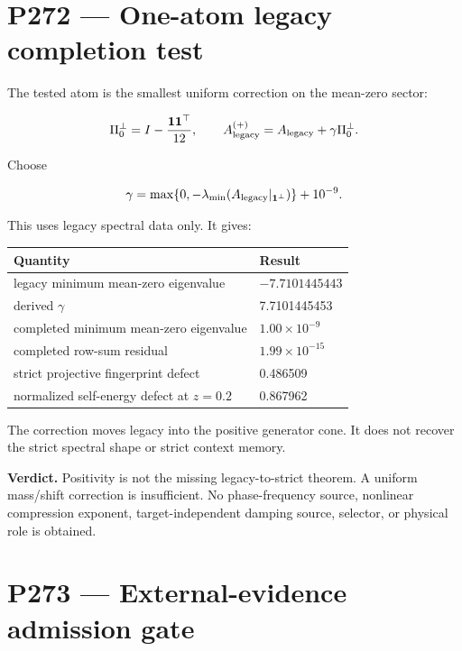 \documentclass[11pt,a4paper,openany]{report}
\begin{document}
\chapter{P272 --- One-atom legacy completion test}

The tested atom is the smallest uniform correction on the mean-zero sector:

\[
\Pi_0^\perp
=
I-\frac{\mathbf1\mathbf1^\top}{12},
\qquad
A_{\rm legacy}^{(+)}
=
A_{\rm legacy}+\gamma\Pi_0^\perp.
\]

Choose

\[
\gamma
=
\max\{0,-\lambda_{\min}
(A_{\rm legacy}|_{\mathbf1^\perp})\}
+10^{-9}.
\]

This uses legacy spectral data only. It gives:

\begin{center}
\begingroup\small
\setlength{\tabcolsep}{2.5pt}
\renewcommand{\arraystretch}{1.16}
\begin{longtable}{@{}p{}p{}@{}}
\toprule
\textbf{Quantity} & \textbf{Result} \\
\midrule
\endhead
legacy minimum mean-zero eigenvalue & \(-7.7101445443\) \\
derived \(\gamma\) & 7.7101445453 \\
completed minimum mean-zero eigenvalue & \(1.00\times10^{-9}\) \\
completed row-sum residual & \(1.99\times10^{-15}\) \\
strict projective fingerprint defect & 0.486509 \\
normalized self-energy defect at \(z=0.2\) & 0.867962 \\
\bottomrule
\end{longtable}
\endgroup
\end{center}

The correction moves legacy into the positive generator cone. It does not recover the strict spectral shape or strict context memory.

\textbf{Verdict.} Positivity is not the missing legacy-to-strict theorem. A uniform mass/\allowbreak{}shift correction is insufficient. No phase-frequency source, nonlinear compression exponent, target-independent damping source, selector, or physical role is obtained.

\chapter{P273 --- External-evidence admission gate}
\end{document}
